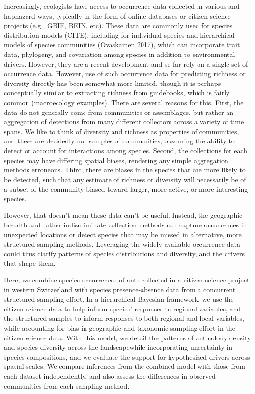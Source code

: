 \documentclass[preprint,review,times,12pt]{elsarticle}
\begin{document}
Increasingly, ecologists have access to occurrence data collected in various and haphazard ways, typically in the form of online databases or citizen science projects (e.g., GBIF, BEIN, etc). These data are commonly used for species distribution models (CITE), including for individual species and hierarchical models of species communities (Ovaskainen 2017), which can incorporate trait data, phylogeny, and covariation among species in addition to environmental drivers. However, they are a recent development and so far rely on a single set of occurrence data. However, use of such occurrence data for predicting richness or diversity directly has been somewhat more limited, though it is perhaps conceptually similar to extracting richness from guidebooks, which is fairly common (macroecology examples). There are several reasons for this. First, the data do not generally come from communities or assemblages, but rather an aggregation of detections from many different collectors across a variety of time spans. We like to think of diversity and richness as properties of communities, and these are decidedly not samples of communities, obscuring the ability to detect or account for interactions among species. Second, the collections for each species may have differing spatial biases, rendering any simple aggregation methods erroneous. Third, there are biases in the species that are more likely to be detected, such that any estimate of richness or diversity will necessarily be of a subset of the community biased toward larger, more active, or more interesting species.

However, that doesn't mean these data can't be useful. Instead, the geographic breadth and rather indiscriminate collection methods can capture occurrences in unexpected locations or detect species that may be missed in alternative, more structured sampling methods. Leveraging the widely available occurrence data could thus clarify patterns of species distributions and diversity, and the drivers that shape them.

Here, we combine species occurrences of ants collected in a citizen science project in western Switzerland with species presence-absence data from a concurrent structured sampling effort. In a hierarchical Bayesian framework, we use the citizen science data to help inform species' responses to regional variables, and the structured samples to inform responses to both regional and local variables, while accounting for bias in geographic and taxonomic sampling effort in the citizen science data. With this model, we detail the patterns of ant colony density and species diversity across the landscapewhile incorporating uncertainty in species compositions, and we evaluate the support for hypothesized drivers across spatial scales. We compare inferences from the combined model with those from each dataset independently, and also assess the differences in observed communities from each sampling method. 
\end{document}
